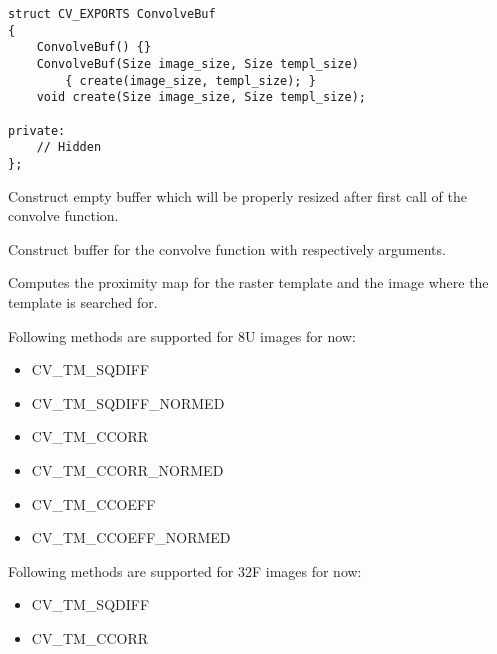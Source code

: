 \begin{lstlisting}
struct CV_EXPORTS ConvolveBuf
{
    ConvolveBuf() {}
    ConvolveBuf(Size image_size, Size templ_size) 
        { create(image_size, templ_size); }
    void create(Size image_size, Size templ_size);

private:
    // Hidden
};
\end{lstlisting}



Construct empty buffer which will be properly resized after first call of the convolve function.

Construct buffer for the convolve function with respectively arguments.


Computes the proximity map for the raster template and the image where the template is searched for.


\begin{description}
\end{description}
Following methods are supported for 8U images for now:
\begin{itemize}
\item CV\_TM\_SQDIFF \item CV\_TM\_SQDIFF\_NORMED \item CV\_TM\_CCORR \item CV\_TM\_CCORR\_NORMED \item CV\_TM\_CCOEFF \item CV\_TM\_CCOEFF\_NORMED 
\end{itemize}
Following methods are supported for 32F images for now:
\begin{itemize}
\item CV\_TM\_SQDIFF \item CV\_TM\_CCORR
\end{itemize}

